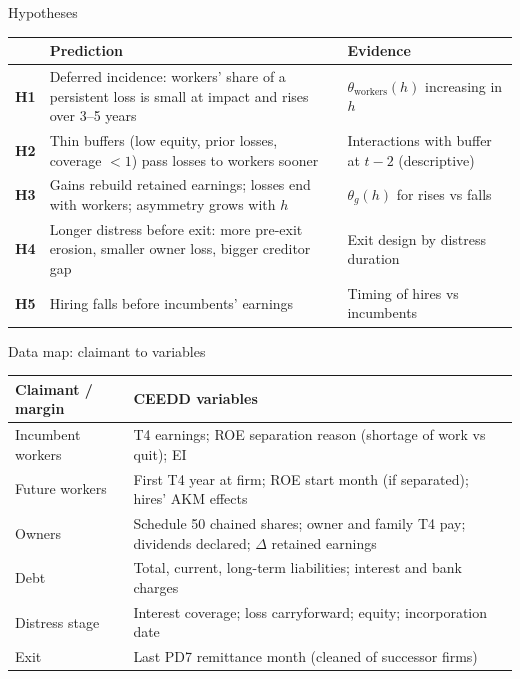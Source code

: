 \documentclass[aspectratio=169,11pt]{beamer}
\newlength{\safezone}
\newcommand{\hy}[1]{\textbf{\textcolor{SlateTeal}{#1}}}
\begin{document}
\begin{frame}[label=hyp]{Hypotheses}
  \small
  \renewcommand{\arraystretch}{1.25}
  \begin{tabularx}{\textwidth}{p{0.8cm} >{\raggedright\arraybackslash}X >{\raggedright\arraybackslash}p{3.4cm}}
    \toprule
     & \textbf{Prediction} & \textbf{Evidence} \\
    \midrule
    \hy{H1} & Deferred incidence: workers' share of a persistent loss is small at impact and rises over 3--5 years & $\theta_{\text{workers}}(h)$ increasing in $h$ \\
    \hy{H2} & Thin buffers (low equity, prior losses, coverage $<1$) pass losses to workers sooner & Interactions with buffer at $t-2$ (descriptive) \\
    \hy{H3} & Gains rebuild retained earnings; losses end with workers; asymmetry grows with $h$ & $\theta_g(h)$ for rises vs falls \\
    \hy{H4} & Longer distress before exit: more pre-exit erosion, smaller owner loss, bigger creditor gap & Exit design by distress duration \\
    \hy{H5} & Hiring falls before incumbents' earnings & Timing of hires vs incumbents \\
    \bottomrule
  \end{tabularx}
  \vfill
  \hfill \hyperlink{approach2}{}\hspace{\safezone}
\end{frame}

\begin{frame}{Data map: claimant to variables}
  \small
  \renewcommand{\arraystretch}{1.2}
  \begin{tabularx}{\textwidth}{>{\raggedright\arraybackslash}p{3.2cm} >{\raggedright\arraybackslash}X}
    \toprule
    \textbf{Claimant / margin} & \textbf{CEEDD variables} \\
    \midrule
    Incumbent workers & T4 earnings; ROE separation reason (shortage of work vs quit); EI \\
    Future workers & First T4 year at firm; ROE start month (if separated); hires' AKM effects \\
    Owners & Schedule 50 chained shares; owner and family T4 pay; dividends declared; $\Delta$ retained earnings \\
    Debt & Total, current, long-term liabilities; interest and bank charges \\
    Distress stage & Interest coverage; loss carryforward; equity; incorporation date \\
    Exit & Last PD7 remittance month (cleaned of successor firms) \\
    \bottomrule
  \end{tabularx}
\end{frame}
\end{document}
